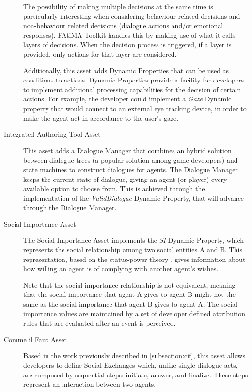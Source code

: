 \begin{description}
The possibility of making multiple decisions at the same time is particularly interesting when considering behaviour related decisions and non-behaviour related decisions (dialogue actions and/or emotional responses).
\ac{FAtiMA} Toolkit handles this by making use of what it calls layers of decisions.
When the decision process is triggered, if a layer is provided, only actions for that layer are considered.

Additionally, this asset adds Dynamic Properties that can be used as conditions to actions.
Dynamic Properties provide a facility for developers to implement additional processing capabilities for the decision of certain actions.
For example, the developer could implement a \textit{Gaze} Dynamic property that would connect to an external eye tracking device, in order to make the agent act in accordance to the user's gaze.

\item [Integrated Authoring Tool Asset] \hfill

This asset adds a Dialogue Manager that combines an hybrid solution between dialogue trees (a popular solution among game developers) and state machines to construct dialogues for agents.
The Dialogue Manager keeps the current state of dialogue, giving an agent (or player) every available option to choose from.
This is achieved through the implementation of the \textit{ValidDialogue} Dynamic Property, that will advance through the Dialogue Manager.

\item [Social Importance Asset] \hfill

The Social Importance Asset implements the \textit{SI} Dynamic Property, which represents the social relationship among two social entities A and B.
This representation, based on the status-power theory \cite{kemper:status-power}, gives information about how willing an agent is of complying with another agent's wishes.

Note that the social importance relationship is not equivalent, meaning that the social importance that agent A gives to agent B might not the same as the social importance that agent B gives to agent A.
The social importance values are maintained by a set of developer defined attribution rules that are evaluated after an event is perceived.

\item [Comme il Faut Asset] \hfill

Based in the work previously described in \ref{subsection:cif}, this asset allows developers to define Social Exchanges which, unlike single dialogue acts, are composed by sequential steps: initiate, answer, and finalize.
These steps represent an interaction between two agents.


\end{description}
